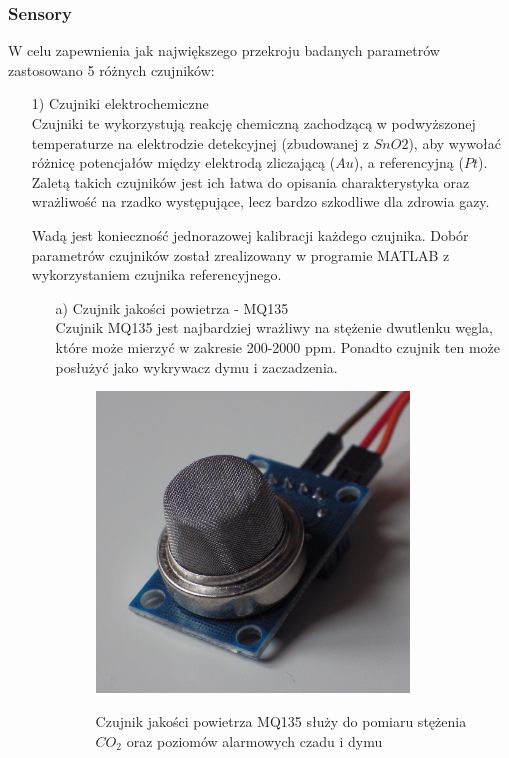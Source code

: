 \documentclass[12pt,a4paper]{article}
\begin{document}
\subsubsection{Sensory}
W celu zapewnienia jak największego przekroju badanych parametrów zastosowano 5 różnych czujników:
\begin{enumerate}
	\item[1)] Czujniki elektrochemiczne\\
	Czujniki te wykorzystują reakcję chemiczną zachodzącą w podwyższonej temperaturze na elektrodzie detekcyjnej (zbudowanej z $SnO2$), aby wywołać różnicę potencjałów między elektrodą zliczającą ($Au$), a referencyjną ($Pt$). Zaletą takich czujników jest ich łatwa do opisania charakterystyka oraz wrażliwość na rzadko występujące, lecz bardzo szkodliwe dla zdrowia gazy. 

	Wadą jest konieczność jednorazowej kalibracji każdego czujnika. Dobór parametrów czujników został zrealizowany w programie MATLAB z wykorzystaniem czujnika referencyjnego.

	\begin{enumerate}
		\item[a)] Czujnik jakości powietrza - MQ135 \\
		Czujnik MQ135 jest najbardziej wrażliwy na stężenie dwutlenku węgla, które może mierzyć w zakresie 200-2000 ppm. Ponadto czujnik ten może posłużyć jako wykrywacz dymu i zaczadzenia.
		
\begin{figure}[!h]
	\centering
	\includegraphics[height =80mm]{MQ135.jpg}
	\label{MQ135}
	\caption{Czujnik jakości powietrza MQ135 służy do pomiaru stężenia $CO_2$ oraz poziomów alarmowych czadu i dymu}
\end{figure}

\newpage


\end{enumerate}
\end{enumerate}
\end{document}
